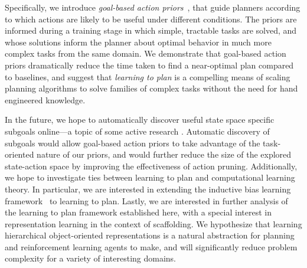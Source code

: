 \documentclass[11pt]{article}
\begin{document}
Specifically, we introduce {\it goal-based action priors}~\cite{abel2015goal}, that guide planners according to which actions are likely to be useful under different conditions. The priors are informed during a training stage in which simple, tractable tasks are solved, and whose solutions inform the planner about optimal behavior in much more complex tasks from the same domain. We demonstrate that goal-based action priors dramatically reduce the time taken to find a near-optimal plan compared to baselines, and suggest that {\it learning to plan} is a compelling means of scaling planning algorithms to solve families of complex tasks without the need for hand engineered knowledge.

In the future, we hope to automatically discover useful state space
specific subgoals online---a topic of some active research
\cite{Mcgovern01automaticdiscovery,Simsek:2005:IUS:1102351.1102454}.
Automatic discovery of subgoals would allow goal-based action priors
to take advantage of the task-oriented nature of our priors, and would
further reduce the size of the explored state-action space by
improving the effectiveness of action pruning. Additionally, we hope to investigate ties between learning to plan and computational learning theory. In particular, we are interested in extending the inductive bias learning framework~\cite{baxter2000model} to learning to plan. Lastly, we are interested in further analysis of the learning to plan framework established here, with a special interest in representation learning in the context of scaffolding. We hypothesize that learning hierarchical object-oriented representations is a natural abstraction for planning and reinforcement learning agents to make, and will significantly reduce problem complexity for a variety of interesting domains.




\end{document}
